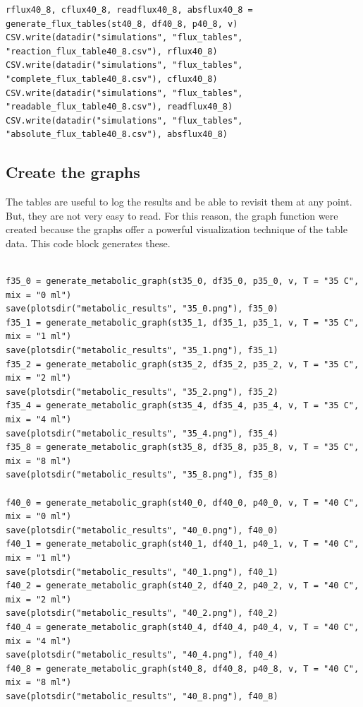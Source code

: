 \documentclass[11pt]{article}
\begin{document}
\begin{verbatim}
rflux40_8, cflux40_8, readflux40_8, absflux40_8 = generate_flux_tables(st40_8, df40_8, p40_8, v)
CSV.write(datadir("simulations", "flux_tables", "reaction_flux_table40_8.csv"), rflux40_8)
CSV.write(datadir("simulations", "flux_tables", "complete_flux_table40_8.csv"), cflux40_8)
CSV.write(datadir("simulations", "flux_tables", "readable_flux_table40_8.csv"), readflux40_8)
CSV.write(datadir("simulations", "flux_tables", "absolute_flux_table40_8.csv"), absflux40_8)
\end{verbatim}

\subsection{Create the graphs}
\label{sec:org91351b2}
The tables are useful to log the results and be able to revisit them at any point. But, they are not very easy to read. For this reason, the graph function were created because the graphs offer a powerful visualization technique of the table data. This code block generates these.

\begin{verbatim}

f35_0 = generate_metabolic_graph(st35_0, df35_0, p35_0, v, T = "35 C", mix = "0 ml")
save(plotsdir("metabolic_results", "35_0.png"), f35_0)
f35_1 = generate_metabolic_graph(st35_1, df35_1, p35_1, v, T = "35 C", mix = "1 ml")
save(plotsdir("metabolic_results", "35_1.png"), f35_1)
f35_2 = generate_metabolic_graph(st35_2, df35_2, p35_2, v, T = "35 C", mix = "2 ml")
save(plotsdir("metabolic_results", "35_2.png"), f35_2)
f35_4 = generate_metabolic_graph(st35_4, df35_4, p35_4, v, T = "35 C", mix = "4 ml")
save(plotsdir("metabolic_results", "35_4.png"), f35_4)
f35_8 = generate_metabolic_graph(st35_8, df35_8, p35_8, v, T = "35 C", mix = "8 ml")
save(plotsdir("metabolic_results", "35_8.png"), f35_8)

f40_0 = generate_metabolic_graph(st40_0, df40_0, p40_0, v, T = "40 C", mix = "0 ml")
save(plotsdir("metabolic_results", "40_0.png"), f40_0)
f40_1 = generate_metabolic_graph(st40_1, df40_1, p40_1, v, T = "40 C", mix = "1 ml")
save(plotsdir("metabolic_results", "40_1.png"), f40_1)
f40_2 = generate_metabolic_graph(st40_2, df40_2, p40_2, v, T = "40 C", mix = "2 ml")
save(plotsdir("metabolic_results", "40_2.png"), f40_2)
f40_4 = generate_metabolic_graph(st40_4, df40_4, p40_4, v, T = "40 C", mix = "4 ml")
save(plotsdir("metabolic_results", "40_4.png"), f40_4)
f40_8 = generate_metabolic_graph(st40_8, df40_8, p40_8, v, T = "40 C", mix = "8 ml")
save(plotsdir("metabolic_results", "40_8.png"), f40_8)
\end{verbatim}
\end{document}
